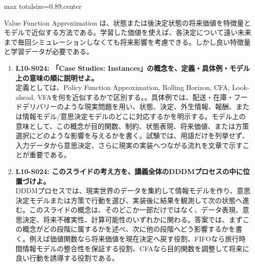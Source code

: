 \begin{minipage}[t]{0.58\textwidth}
\begin{adjustbox}{max totalsize={\textwidth}{0.89\textheight},center}
\begin{minipage}{\textwidth}
Value Function Approximation は、状態または後決定状態の将来価値を特徴量とモデルで近似する方法である。学習した価値を使えば、各決定について遠い未来まで毎回シミュレーションしなくても将来影響を考慮できる。しかし良い特徴量と学習データが必要である。\par{}\begin{enumerate}\item \textbf{L10-S024: 「Case Studies: Instances」の概念を、定義・具体例・モデル上の意味の順に説明せよ。}\\定義としては、Policy Function Approximation, Rolling Horizon, CFA, Look-ahead, VFAを何を近似するかで区別する。。具体例では、配送・在庫・フードデリバリーのような現実問題を用い、状態、決定、外生情報、報酬、または情報モデル/意思決定モデルのどこに対応するかを明示する。モデル上の意味として、この概念が目的関数、制約、状態表現、将来価値、または方策選択にどのような影響を与えるかを書く。試験では、用語だけを列挙せず、入力データから意思決定、さらに現実の実装へつながる流れを文章で示すことが重要である。\item \textbf{L10-S024: このスライドの考え方を、講義全体のDDDMプロセスの中に位置づけよ。}\\DDDMプロセスでは、現実世界のデータを集約して情報モデルを作り、意思決定モデルまたは方策で行動を選び、実装後に結果を観測して次の状態へ進む。このスライドの概念は、そのどこか一部だけではなく、データ表現、意思決定、将来不確実性、計算可能性のいずれかに関わる。答案では、まずこの概念がどの段階に属するかを述べ、次に他の段階へどう影響するかを書く。例えば価値関数なら将来価値を現在決定へ戻す役割、FIFOなら旅行時間情報モデルの整合性を保証する役割、CFAなら目的関数を調整して将来に良い行動を誘導する役割である。\end{enumerate}
\end{minipage}
\end{adjustbox}
\end{minipage}



